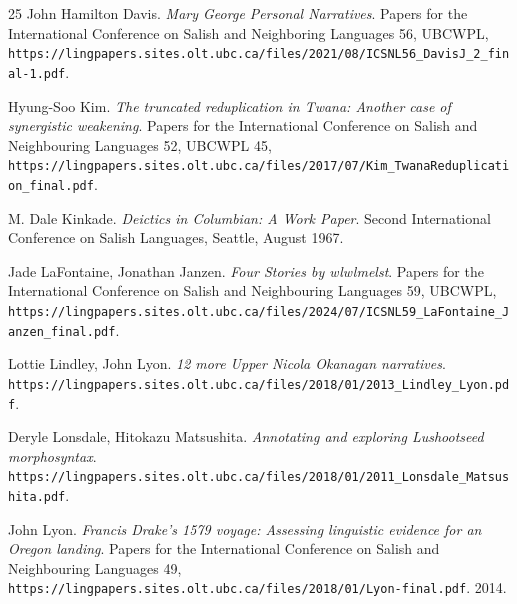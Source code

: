 \begin{thebibliography}{25}
John Hamilton Davis. \emph{Mary George Personal Narratives}. Papers for the International Conference on Salish and Neighboring Languages 56, UBCWPL, \texttt{https:/\allowbreak{}/\allowbreak{}lingpapers.sites.olt.ubc.ca/\allowbreak{}files/\allowbreak{}2021/\allowbreak{}08/\allowbreak{}ICSNL56\_\allowbreak{}DavisJ\_\allowbreak{}2\_\allowbreak{}final-1.pdf}.

Hyung-Soo Kim. \emph{The truncated reduplication in Twana: Another case of synergistic weakening}. Papers for the International Conference on Salish and Neighbouring Languages 52, UBCWPL 45, \texttt{https:/\allowbreak{}/\allowbreak{}lingpapers.sites.olt.ubc.ca/\allowbreak{}files/\allowbreak{}2017/\allowbreak{}07/\allowbreak{}Kim\_\allowbreak{}TwanaReduplication\_\allowbreak{}final.pdf}.

M. Dale Kinkade. \emph{Deictics in Columbian: A Work Paper}. Second International Conference on Salish Languages, Seattle, August 1967.

Jade LaFontaine, Jonathan Janzen. \emph{Four Stories by wlwlmelst}. Papers for the International Conference on Salish and Neighbouring Languages 59, UBCWPL, \texttt{https:/\allowbreak{}/\allowbreak{}lingpapers.sites.olt.ubc.ca/\allowbreak{}files/\allowbreak{}2024/\allowbreak{}07/\allowbreak{}ICSNL59\_\allowbreak{}LaFontaine\_\allowbreak{}Janzen\_\allowbreak{}final.pdf}.

Lottie Lindley, John Lyon. \emph{12 more Upper Nicola Okanagan narratives}. \texttt{https:/\allowbreak{}/\allowbreak{}lingpapers.sites.olt.ubc.ca/\allowbreak{}files/\allowbreak{}2018/\allowbreak{}01/\allowbreak{}2013\_\allowbreak{}Lindley\_\allowbreak{}Lyon.pdf}.

Deryle Lonsdale, Hitokazu Matsushita. \emph{Annotating and exploring Lushootseed morphosyntax}. \texttt{https:/\allowbreak{}/\allowbreak{}lingpapers.sites.olt.ubc.ca/\allowbreak{}files/\allowbreak{}2018/\allowbreak{}01/\allowbreak{}2011\_\allowbreak{}Lonsdale\_\allowbreak{}Matsushita.pdf}.

John Lyon. \emph{Francis Drake's 1579 voyage: Assessing linguistic evidence for an Oregon landing}. Papers for the International Conference on Salish and Neighbouring Languages 49, \texttt{https:/\allowbreak{}/\allowbreak{}lingpapers.sites.olt.ubc.ca/\allowbreak{}files/\allowbreak{}2018/\allowbreak{}01/\allowbreak{}Lyon-final.pdf}. 2014.


\end{thebibliography}
